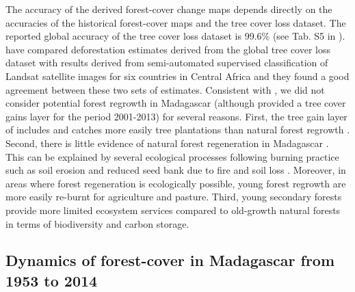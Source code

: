 \documentclass[a4paper, 12pt, leqno]{article} %
\begin{document}
The accuracy of the derived forest-cover change maps depends directly
on the accuracies of the historical forest-cover maps and the tree
cover loss dataset. The reported global accuracy of the tree cover
loss dataset is 99.6\% (see Tab. S5 in \citet{Hansen2013}).
\citet{Verhegghen2016} have compared deforestation estimates derived
from the global tree cover loss dataset \citep{Hansen2013} with
results derived from semi-automated supervised classification of
Landsat satellite images \citep{Achard2014} for six countries in
Central Africa and they found a good agreement between these two sets
of estimates. Consistent with \citet{Harper2007}, we did not consider
potential forest regrowth in Madagascar (although \citet{Hansen2013}
provided a tree cover gains layer for the period 2001-2013) for
several reasons. First, the tree gain layer of \citet{Hansen2013}
includes and catches more easily tree plantations than natural forest
regrowth \citep{Tropek2014}. Second, there is little evidence of
natural forest regeneration in Madagascar \citep{Grouzis2001,
 Harper2007}. This can be explained by several ecological processes
following burning practice such as soil erosion \citep{Grinand2017}
and reduced seed bank due to fire and soil loss
\citep{Grouzis2001}. Moreover, in areas where forest regeneration is
ecologically possible, young forest regrowth are more easily re-burnt
for agriculture and pasture. Third, young secondary forests provide
more limited ecosystem services compared to old-growth natural forests
in terms of biodiversity and carbon storage.

\subsection{Dynamics of forest-cover in Madagascar from 1953 to 2014}
\end{document}
